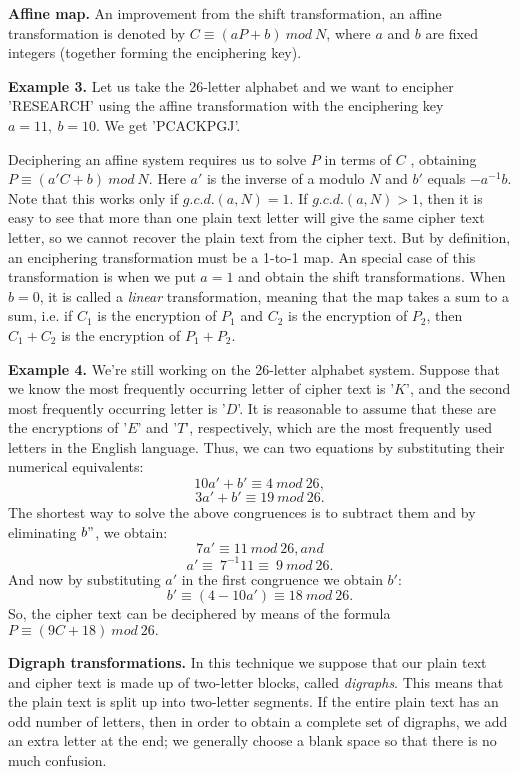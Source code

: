 \documentclass[12pt]{article}
\begin{document}
\textbf{Affine map.} An improvement from the shift transformation, an affine transformation is denoted by $C \equiv (aP+b) \: mod \: N$, where $a$ and $b$ are fixed integers (together forming the enciphering key).

\textbf{Example 3.} Let us take the 26-letter alphabet and we want to encipher 'RESEARCH' using the affine transformation with the enciphering key $a=11, \:b=10$. We get 'PCACKPGJ'.

Deciphering an affine system requires us to solve $P$ in terms of $C$ , obtaining $P \equiv (a'C+b) \: mod \: N.$ Here $a'$ is the inverse of a modulo $N$ and $b'$ equals $-a^{-1}b$. Note that this works only if $g.c.d.(a,N)=1$. If $g.c.d.(a,N)>1$, then it is easy to see that more than one plain text letter will give the same cipher text letter, so we cannot recover the plain text from the cipher text. But by definition, an enciphering transformation must be a 1-to-1 map. An special case of this transformation is when we put $a=1$ and obtain the shift transformations. When  $b=0$, it is called a \textit{linear} transformation, meaning that the map takes a sum to a sum, i.e. if $C_1$ is the encryption of $P_1$ and $C_2$ is the encryption of $P_2$, then $C_1+C_2$ is the encryption of $P_1+P_2$.

\textbf{Example 4.} We're still working on the 26-letter alphabet system. Suppose that we know the most frequently occurring letter of cipher text is '$K$', and the second most frequently occurring letter is '$D$'. It is reasonable to assume that these are the encryptions of '$E$' and '$T$', respectively, which are the most frequently used letters in the English language.  Thus, we can two equations by substituting their numerical equivalents:
$$10a'+b' \equiv 4 \: mod \: 26,$$
$$3a'+b' \equiv 19 \: mod \: 26.$$
The shortest way to solve the above congruences is to subtract them and by eliminating $b"$, we obtain:
$$7a' \equiv 11\: mod \:26, and$$
$$a' \equiv \:7^{-1}11 \equiv \: 9 \: mod \: 26.$$
And now by substituting $a'$ in the first congruence we obtain $b'$:
$$b' \equiv (4-10a') \equiv 18 \: mod \: 26.$$
So, the cipher text can be deciphered by means of the formula $P \equiv (9C + 18) \: mod \: 26.$

\textbf{Digraph transformations.} In this technique we suppose that our plain text and cipher text is made up of two-letter blocks, called \textit{digraphs}. This means that the plain text is split up into two-letter segments. If the entire plain text has an odd number of letters, then in order to obtain a complete set of digraphs, we add an extra letter at the end; we generally choose a blank space so that there is no much confusion.
\end{document}
